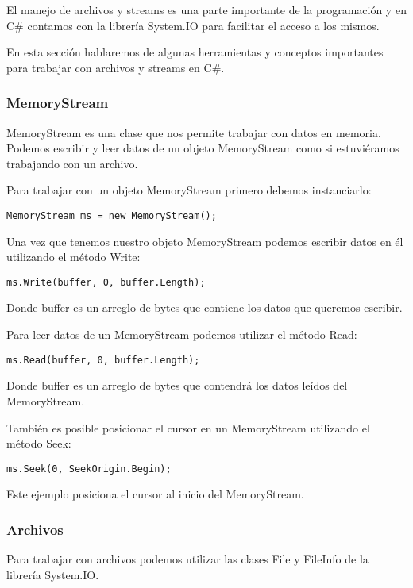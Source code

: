 \documentclass[executivepaper]{article}
\begin{document}
El manejo de archivos y streams es una parte importante de la programación y en C\# contamos con la librería System.IO para facilitar el acceso a los mismos.

En esta sección hablaremos de algunas herramientas y conceptos importantes para trabajar con archivos y streams en C\#.

\subsubsection*{MemoryStream}
MemoryStream es una clase que nos permite trabajar con datos en memoria. Podemos escribir y leer datos de un objeto MemoryStream como si estuviéramos trabajando con un archivo.

Para trabajar con un objeto MemoryStream primero debemos instanciarlo:

\begin{lstlisting}
MemoryStream ms = new MemoryStream();
\end{lstlisting}

Una vez que tenemos nuestro objeto MemoryStream podemos escribir datos en él utilizando el método Write:

\begin{lstlisting}
ms.Write(buffer, 0, buffer.Length);
\end{lstlisting}

Donde buffer es un arreglo de bytes que contiene los datos que queremos escribir.

Para leer datos de un MemoryStream podemos utilizar el método Read:

\begin{lstlisting}
ms.Read(buffer, 0, buffer.Length);
\end{lstlisting}

Donde buffer es un arreglo de bytes que contendrá los datos leídos del MemoryStream.

También es posible posicionar el cursor en un MemoryStream utilizando el método Seek:

\begin{lstlisting}
ms.Seek(0, SeekOrigin.Begin);
\end{lstlisting}

Este ejemplo posiciona el cursor al inicio del MemoryStream.

\subsubsection*{Archivos}
Para trabajar con archivos podemos utilizar las clases File y FileInfo de la librería System.IO.
\end{document}
